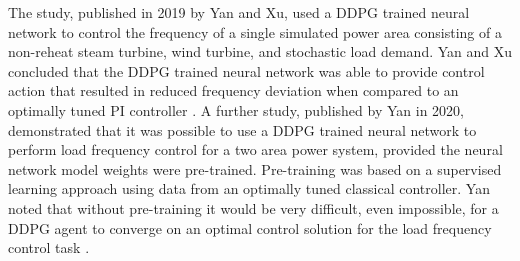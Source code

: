 The study, published in 2019 by Yan and Xu, used a DDPG trained neural network to control the frequency of a single simulated power area consisting of a non-reheat steam turbine, wind turbine, and stochastic load demand. Yan and Xu concluded that the DDPG trained neural network was able to provide control action that resulted in reduced frequency deviation when compared to an optimally tuned PI controller \cite{Yan2019}. A further study, published by Yan in 2020, demonstrated that it was possible to use a DDPG trained neural network to perform load frequency control for a two area power system, provided the neural network model weights were pre-trained. Pre-training was based on a supervised learning approach using data from an optimally tuned classical controller. Yan noted that without pre-training it would be very difficult, even impossible, for a DDPG agent to converge on an optimal control solution for the load frequency control task \cite{Yan2020}.

